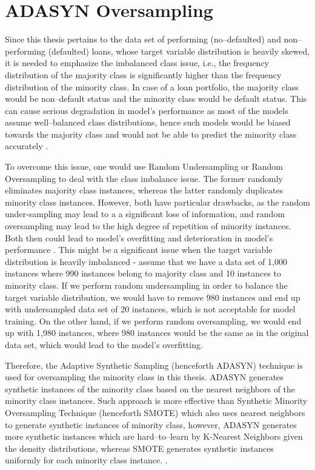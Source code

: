 \newpage
\section{ADASYN Oversampling}
\label{sec:adasyntheory}
Since this thesis pertains to the data set of performing (no--defaulted) and non--performing (defaulted) loans, whose target variable distribution is heavily skewed, it is needed to emphasize the imbalanced class issue, i.e., the frequency distribution of the majority class is significantly higher than the frequency distribution of the minority class.
In case of a loan portfolio, the majority class would be non--default status and the minority class would be default status.
This can cause serious degradation in model's performance as most of the models assume well--balanced class distributions, hence such models would be biased towards the majority class and would not be able to predict the minority class accurately \citep{prati2009data}.

To overcome this issue, one would use Random Undersampling or Random Oversampling to deal with the class imbalance issue. The former randomly eliminates majority class instances, whereas the latter randomly duplicates minority class instances.
However, both have particular drawbacks, as the random under-sampling may lead to a a significant loss of information, and random oversampling may lead to the high degree of repetition of minority instances. Both then could lead to model's overfitting and deterioration in model's performance \citep{ma2013imbalanced}.
This might be a significant issue when the target variable distribution is heavily imbalanced - assume that we have a data set of 1,000 instances where 990 instances belong to majority class and 10 instances to minority class.
If we perform random undersampling in order to balance the target variable distribution, we would have to remove 980 instances and end up with undersampled data set of 20 instances, which is not acceptable for model training.
On the other hand, if we perform random oversampling, we would end up with 1,980 instances, where 980 instances would be the same as in the original data set, which would lead to the model's overfitting.

Therefore, the Adaptive Synthetic Sampling (henceforth ADASYN) technique is used for oversampling the minority class in this thesis.
ADASYN generates synthetic instances of the minority class based on the nearest neighbors of the minority class instances.
Such approach is more effective than Synthetic Minority Oversampling Technique (henceforth SMOTE) which also uses nearest neighbors to generate synthetic instances of minority class, however, ADASYN generates more synthetic instances which are hard--to--learn by K-Nearest Neighbors given the density distributions, whereas SMOTE generates synthetic instances uniformly for each minority class instance.
 \citep{adasynhaibo}. 

